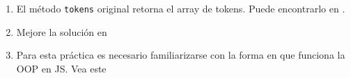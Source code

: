 \begin{enumerate}
\begin{itemize}
\begin{verbatim}
[~/srcPLgrado/lexical_analysis_top_down_operator_precedence(gh-pages)]$ pwd -P
/Users/casiano/local/src/javascript/PLgrado/lexical_analysis_top_down_operator_precedence
\end{verbatim}
\end{itemize}
\item El método \verb|tokens| original retorna el array de tokens. Puede encontrarlo en
.
\item
Mejore la solución en
\item
Para esta práctica es necesario familiarizarse con la forma en que funciona la OOP
en JS. Vea este
\end{enumerate}
